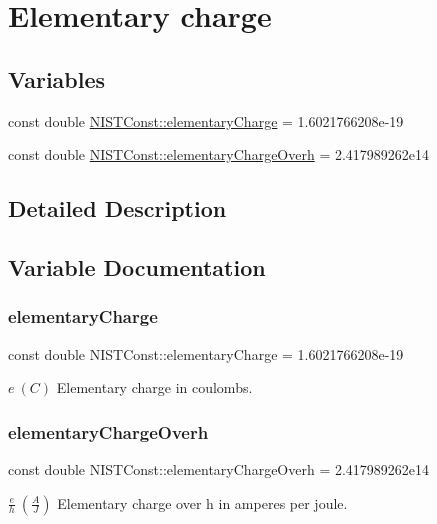 \hypertarget{group___n_i_s_t_const-_elementary_charge}{}\section{Elementary charge}
\label{group___n_i_s_t_const-_elementary_charge}
\subsection*{Variables}
\begin{DoxyCompactItemize}
\item 
const double \mbox{\hyperlink{group___n_i_s_t_const-_elementary_charge_gaaa025a77a5281c83628ff8cb46f8038f}{N\+I\+S\+T\+Const\+::elementary\+Charge}} = 1.\+6021766208e-\/19
\item 
const double \mbox{\hyperlink{group___n_i_s_t_const-_elementary_charge_ga262dea92054df909a97626e3c804f1b4}{N\+I\+S\+T\+Const\+::elementary\+Charge\+Overh}} = 2.\+417989262e14
\end{DoxyCompactItemize}


\subsection{Detailed Description}


\subsection{Variable Documentation}
\mbox{\label{group___n_i_s_t_const-_elementary_charge_gaaa025a77a5281c83628ff8cb46f8038f}} 
\subsubsection{\texorpdfstring{elementary\+Charge}{elementaryCharge}}
{\footnotesize\ttfamily const double N\+I\+S\+T\+Const\+::elementary\+Charge = 1.\+6021766208e-\/19}

$e \ (C)$ Elementary charge in coulombs. \mbox{\label{group___n_i_s_t_const-_elementary_charge_ga262dea92054df909a97626e3c804f1b4}} 
\subsubsection{\texorpdfstring{elementary\+Charge\+Overh}{elementaryChargeOverh}}
{\footnotesize\ttfamily const double N\+I\+S\+T\+Const\+::elementary\+Charge\+Overh = 2.\+417989262e14}

$\frac{e}{h} \ (\frac{A}{J})$ Elementary charge over h in amperes per joule. 